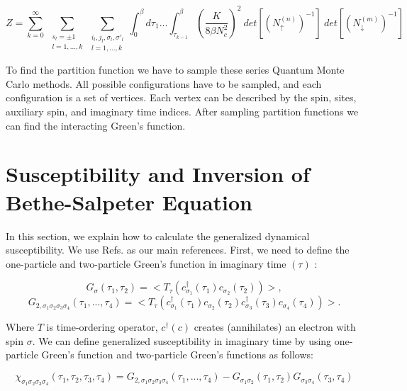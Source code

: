 \begin{equation}
    Z= \sum _{k=0} ^ {\infty} \: \sum _{\substack{s_l=\pm 1 \\ l=1,... ,k}} \sum _{\substack{i_l,j_l,\sigma _l, \sigma '_l \\ l=1,... ,k}} \int _0 ^ {\beta} d\tau _1 ... \int _{\tau _{k-1}} ^{\beta} \left(\frac{K}{8 \beta N_c ^2}\right)^2 \: det \left[(N_{\uparrow}^{(n)})^{-1}\right]\: det \left[(N_{\downarrow}^{(m)})^{-1}\right]
\end{equation}

To find the partition function we have to sample these series Quantum Monte Carlo methods. All possible configurations have to be sampled, and each configuration is a set of vertices. Each vertex can be described by  the spin, sites, auxiliary spin, and imaginary time indices. After sampling partition functions we can find the interacting Green's function.

\section{ Susceptibility and Inversion of Bethe-Salpeter Equation}

In this section, we explain how to calculate the generalized dynamical susceptibility. We use Refs. \cite{Thomas, Valli, Macridin} as our main references. First, we need to define the one-particle and two-particle Green's function in imaginary time $(\tau)$ \cite{Valli}:

\begin{equation}
    G_\sigma (\tau _1 ,\tau _2)= <T_\tau (c_{\sigma_1}^\dagger (\tau_1) c_{\sigma_2} (\tau_2))>,
\end{equation}
\begin{equation}
    G_{2,\sigma_1 \sigma_2 \sigma_3 \sigma_4} (\tau_1 , ...,\tau_4)= <T_\tau (c_{ \sigma_1}^\dagger (\tau_1) c_{\sigma_2} (\tau_2)c_{ \sigma_3}^\dagger (\tau_3) c_{ \sigma_4} (\tau_4))>.
\end{equation}

\noindent Where $T$ is time-ordering operator, $c^\dagger (c)$ creates (annihilates) an electron with spin $\sigma$. We can define generalized susceptibility in imaginary time by using one-particle Green's function  and two-particle Green's functions as follows:


\begin{equation}
     \chi _{\sigma_1 \sigma_2 \sigma_3 \sigma_4} (\tau_1 , \tau_2, \tau_3, \tau_4)= G_{2,\sigma_1 \sigma_2 \sigma_3 \sigma_4} (\tau_1 , ...,\tau_4)- G_{\sigma _1 \sigma _2}(\tau_1 , \tau _2) G_{\sigma _3 \sigma _4}(\tau_3 , \tau _4)
\end{equation}


